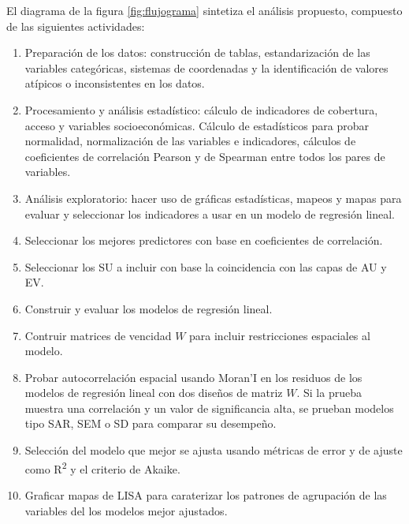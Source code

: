 \documentclass[12pt,a4paper,oneside, openany]{book}
\providecommand{\tightlist}{%
  \setlength{\itemsep}{0pt}\setlength{\parskip}{0pt}}
\theoremstyle{definition}
\theoremstyle{definition}
\theoremstyle{definition}
\theoremstyle{remark}
\begin{document}
El diagrama de la figura \ref{fig:flujograma} sintetiza el análisis
propuesto, compuesto de las siguientes actividades:

\begin{enumerate}
\def\labelenumi{\arabic{enumi}.}
\tightlist
\item
  Preparación de los datos: construcción de tablas, estandarización de
  las variables categóricas, sistemas de coordenadas y la identificación
  de valores atípicos o inconsistentes en los datos.
\item
  Procesamiento y análisis estadístico: cálculo de indicadores de
  cobertura, acceso y variables socioeconómicas. Cálculo de estadísticos
  para probar normalidad, normalización de las variables e indicadores,
  cálculos de coeficientes de correlación Pearson y de Spearman entre
  todos los pares de variables.
\item
  Análisis exploratorio: hacer uso de gráficas estadísticas, mapeos y
  mapas para evaluar y seleccionar los indicadores a usar en un modelo
  de regresión lineal.
\item
  Seleccionar los mejores predictores con base en coeficientes de
  correlación.
\item
  Seleccionar los SU a incluir con base la coincidencia con las capas de
  AU y EV.
\item
  Construir y evaluar los modelos de regresión lineal.
\item
  Contruir matrices de vencidad \(W\) para incluir restricciones
  espaciales al modelo.
\item
  Probar autocorrelación espacial usando Moran'I en los residuos de los
  modelos de regresión lineal con dos diseños de matriz \(W\). Si la
  prueba muestra una correlación y un valor de significancia alta, se
  prueban modelos tipo SAR, SEM o SD para comparar su desempeño.
\item
  Selección del modelo que mejor se ajusta usando métricas de error y de
  ajuste como R\textsuperscript{2} y el criterio de Akaike.
\item
  Graficar mapas de LISA para caraterizar los patrones de agrupación de
  las variables del los modelos mejor ajustados.
\end{enumerate}
\end{document}

